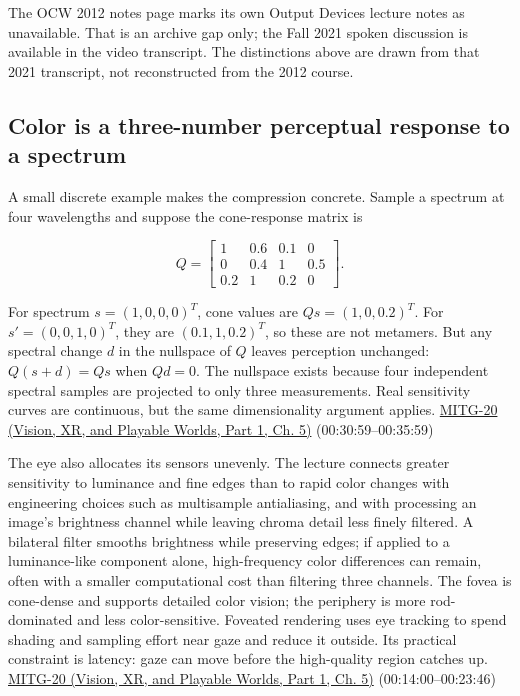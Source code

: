 The OCW 2012 notes page marks its own Output Devices lecture notes as unavailable. That is an archive gap only; the Fall 2021 spoken discussion is available in the video transcript. The distinctions above are drawn from that 2021 transcript, not reconstructed from the 2012 course.

\subsection{Color is a three-number perceptual response to a spectrum}\label{03-visual-computing-i-ch004-color-is-a-three-number-perceptual-response-to-a-spectrum}

\hypertarget{03-visual-computing-i-ch004-color-is-a-three-number-perceptual-response-to-a-spectrum}{}

A small discrete example makes the compression concrete. Sample a spectrum at four wavelengths and suppose the cone-response matrix is

\[
Q=\begin{bmatrix}1&0.6&0.1&0\\0&0.4&1&0.5\\0.2&1&0.2&0\end{bmatrix}.
\]

For spectrum \(s=(1,0,0,0)^T\), cone values are \(Qs=(1,0,0.2)^T\). For \(s'=(0,0,1,0)^T\), they are \((0.1,1,0.2)^T\), so these are not metamers. But any spectral change \(d\) in the nullspace of \(Q\) leaves perception unchanged: \(Q(s+d)=Qs\) when \(Qd=0\). The nullspace exists because four independent spectral samples are projected to only three measurements. Real sensitivity curves are continuous, but the same dimensionality argument applies. \href{../07-Vision-XR-and-Playable-Worlds-P01/main.pdf\#nameddest=04-visual-computing-ii-ch036-mitg-20---color}{MITG-20 (Vision, XR, and Playable Worlds, Part 1, Ch. 5)} (00:30:59--00:35:59)

The eye also allocates its sensors unevenly. The lecture connects greater sensitivity to luminance and fine edges than to rapid color changes with engineering choices such as multisample antialiasing, and with processing an image's brightness channel while leaving chroma detail less finely filtered. A bilateral filter smooths brightness while preserving edges; if applied to a luminance-like component alone, high-frequency color differences can remain, often with a smaller computational cost than filtering three channels. The fovea is cone-dense and supports detailed color vision; the periphery is more rod-dominated and less color-sensitive. Foveated rendering uses eye tracking to spend shading and sampling effort near gaze and reduce it outside. Its practical constraint is latency: gaze can move before the high-quality region catches up. \href{../07-Vision-XR-and-Playable-Worlds-P01/main.pdf\#nameddest=04-visual-computing-ii-ch036-mitg-20---color}{MITG-20 (Vision, XR, and Playable Worlds, Part 1, Ch. 5)} (00:14:00--00:23:46)

